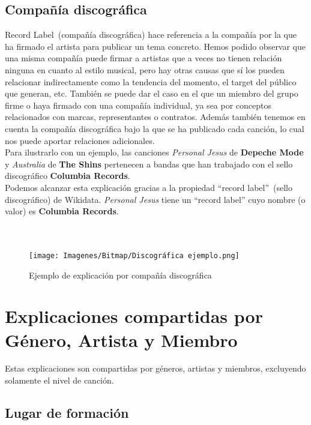 \subsection*{Compañía discográfica}

Record Label~(compañía discográfica) hace referencia a la compañía por la que ha firmado el artista para publicar un tema concreto. Hemos podido observar que una misma compañía puede firmar a artistas que a veces no tienen relación ninguna en cuanto al estilo musical, pero hay otras causas que sí los pueden relacionar indirectamente como la tendencia del momento, el target del público que generan, etc. También se puede dar el caso en el que un miembro del grupo firme o haya firmado con una compañía individual, ya sea por conceptos relacionados con marcas, representantes o contratos. Además también tenemos en cuenta la compañía discográfica bajo la que se ha publicado cada canción, lo cual nos puede aportar relaciones adicionales.\\

Para ilustrarlo con un ejemplo, las canciones \textit{Personal Jesus} de \textbf{Depeche Mode} y \textit{Australia} de \textbf{The Shins} pertenecen a bandas que han trabajado con el sello discográfico \textbf{Columbia Records}.\\

Podemos alcanzar esta explicación gracias a la propiedad ``record label''~(sello discográfico) de Wikidata. \textit{Personal Jesus} tiene un ``record label'' cuyo nombre (o valor) es \textbf{Columbia Records}.\\\\\

\begin{figure}[h!]
	\centering
	\texttt{[image: Imagenes/Bitmap/Discográfica ejemplo.png]}
	\caption{Ejemplo de explicación por compañía discográfica}
	\label{fig:sampleImage}
\end{figure}

\section{Explicaciones compartidas por Género, Artista y Miembro}

Estas explicaciones son compartidas por géneros, artistas y miembros, excluyendo solamente el nivel de canción.\\

\subsection*{Lugar de formación}

